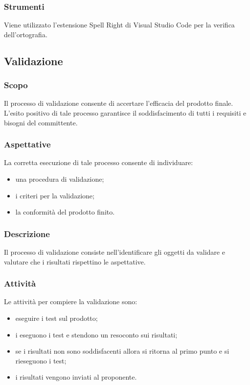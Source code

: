         \subsubsection{Strumenti}
            Viene utilizzato l'estensione Spell Right di Visual Studio Code per la verifica dell'ortografia.
            

    \subsection{Validazione}
        \subsubsection{Scopo}
        Il processo di validazione consente di accertare l'efficacia del prodotto finale. L'esito positivo di tale processo garantisce il soddisfacimento di tutti i requisiti e bisogni del committente.
        \subsubsection{Aspettative}
        La corretta esecuzione di tale processo consente di individuare:
        \begin{itemize}
            \item una procedura di validazione;
            \item i criteri per la validazione;
            \item la conformità del prodotto finito.
        \end{itemize} 
        
        \subsubsection{Descrizione}
        Il processo di validazione consiste nell'identificare gli oggetti da validare e valutare che i risultati rispettino le aspettative.

        \subsubsection{Attività}
        Le attività per compiere la validazione sono:
        \begin{itemize}
            \item eseguire i test sul prodotto;
            \item i \textit{\roleVerifierP{}} eseguono i test e stendono un resoconto sui risultati;
            \item se i risultati non sono soddisfacenti allora si ritorna al primo punto e si rieseguono i test;
            \item i risultati vengono inviati al proponente.
        \end{itemize}
